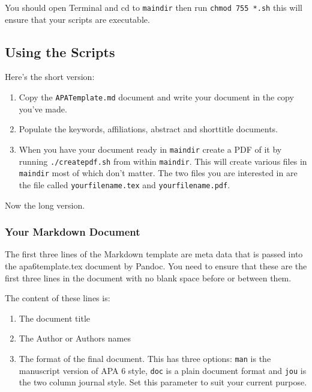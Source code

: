 \documentclass{easychair}
\begin{document}
You should open Terminal and cd to \texttt{maindir} then run
\texttt{chmod 755 *.sh} this will ensure that your scripts are
executable.

\subsection{Using the Scripts}\label{using-the-scripts}

Here's the short version:

\begin{enumerate}
\def\labelenumi{\arabic{enumi}.}
\itemsep1pt\parskip0pt
\item
  Copy the \texttt{APATemplate.md} document and write your document in
  the copy you've made.
\item
  Populate the keywords, affiliations, abstract and shorttitle
  documents.
\item
  When you have your document ready in \texttt{maindir} create a PDF of
  it by running \texttt{./createpdf.sh} from within \texttt{maindir}.
  This will create various files in \texttt{maindir} most of which don't
  matter. The two files you are interested in are the file called
  \texttt{yourfilename.tex} and \texttt{yourfilename.pdf}.
\end{enumerate}

Now the long version.

\subsubsection{Your Markdown Document}\label{your-markdown-document}

The first three lines of the Markdown template are meta data that is
passed into the apa6template.tex document by Pandoc. You need to ensure
that these are the first three lines in the document with no blank space
before or between them.

The content of these lines is:

\begin{enumerate}
\def\labelenumi{\arabic{enumi}.}
\itemsep1pt\parskip0pt
\item
  The document title
\item
  The Author or Authors names
\item
  The format of the final document. This has three options: \texttt{man}
  is the manuscript version of APA 6 style, \texttt{doc} is a plain
  document format and \texttt{jou} is the two column journal style. Set
  this parameter to suit your current purpose.
\end{enumerate}
\end{document}
